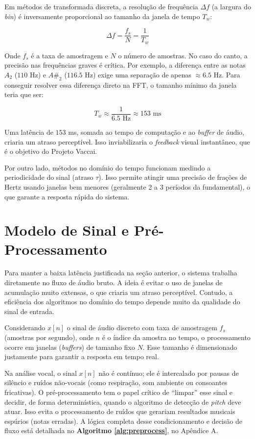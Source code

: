 \documentclass[11pt, a4paper]{article}
\theoremstyle{plain}
\theoremstyle{definition}
\begin{document}
Em métodos de transformada discreta, a resolução de frequência $\Delta f$ (a largura do \textit{bin}) é inversamente proporcional ao tamanho da janela de tempo $T_w$:

\begin{equation}
    \Delta f = \frac{f_s}{N} = \frac{1}{T_w}
\end{equation}

Onde $f_s$ é a taxa de amostragem e $N$ o número de amostras. No caso do canto, a precisão nas frequências graves é crítica. Por exemplo, a diferença entre as notas $A_2$ ($110$ Hz) e $A\#_2$ ($116.5$ Hz) exige uma separação de apenas $\approx 6.5$ Hz. Para conseguir resolver essa diferença direto na FFT, o tamanho mínimo da janela teria que ser:

\begin{equation}
    T_w \approx \frac{1}{6.5 \text{ Hz}} \approx 153 \text{ ms}
\end{equation}

Uma latência de $153$ ms, somada ao tempo de computação e ao \textit{buffer} de áudio, criaria um atraso perceptível. Isso inviabilizaria o \textit{feedback} visual instantâneo, que é o objetivo do Projeto Vaccai.

Por outro lado, métodos no domínio do tempo funcionam medindo a periodicidade do sinal (atraso $\tau$). Isso permite atingir uma precisão de frações de Hertz usando janelas bem menores (geralmente 2 a 3 períodos da fundamental), o que garante a resposta rápida do sistema.

\section{Modelo de Sinal e Pré-Processamento}

Para manter a baixa latência justificada na seção anterior, o sistema trabalha diretamente no fluxo de áudio bruto. A ideia é evitar o uso de janelas de acumulação muito extensas, o que criaria um atraso perceptível. Contudo, a eficiência dos algoritmos no domínio do tempo depende muito da qualidade do sinal de entrada.

Considerando $x[n]$ o sinal de áudio discreto com taxa de amostragem $f_s$ (amostras por segundo), onde $n$ é o índice da amostra no tempo, o processamento ocorre em janelas (\textit{buffers}) de tamanho fixo $N$. Esse tamanho é dimensionado justamente para garantir a resposta em tempo real.

Na análise vocal, o sinal $x[n]$ não é contínuo; ele é intercalado por pausas de silêncio e ruídos não-vocais (como respiração, som ambiente ou consoantes fricativas). O pré-processamento tem o papel crítico de ``limpar'' esse sinal e decidir, de forma determinística, quando o algoritmo de detecção de \textit{pitch} deve atuar. Isso evita o processamento de ruídos que gerariam resultados musicais espúrios (notas erradas). A lógica completa desse condicionamento e decisão de fluxo está detalhada no \textbf{Algoritmo \ref{alg:preprocess}}, no Apêndice A.
\end{document}
